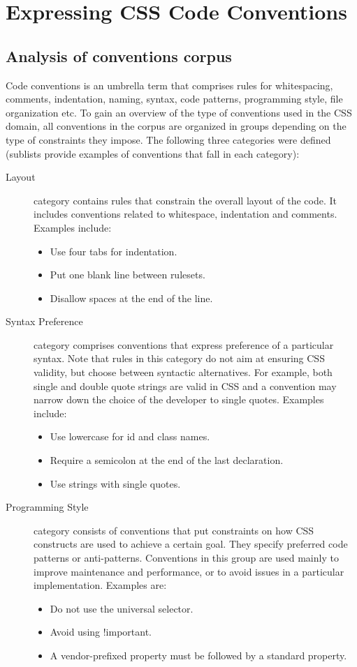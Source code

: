 \chapter{Expressing CSS Code Conventions}
\label{sec:expressing}

\section{Analysis of conventions corpus}

Code conventions is an umbrella term that comprises rules for whitespacing, comments, indentation,
naming, syntax, code patterns, programming style, file organization etc. To gain an overview of the
type of conventions used in the CSS domain, all conventions in the corpus are organized in groups
depending on the type of constraints they impose. The following three categories were defined
(sublists provide examples of conventions that fall in each category):

\begin{description}
  \item[Layout] category contains rules that constrain the overall layout of the code. It includes conventions related to whitespace, indentation and comments. Examples include:
  \begin{itemize}
  \item Use four tabs for indentation.
  \item Put one blank line between rulesets.
  \item Disallow spaces at the end of the line.
  \end{itemize}
  \item[Syntax Preference] category comprises conventions that express preference of a particular syntax. Note that rules in this category do not aim at ensuring CSS validity, but choose between syntactic alternatives. For example, both single and double quote strings are valid in CSS and a convention may narrow down the choice of the developer to single quotes. Examples include:
  \begin{itemize}
  \item Use lowercase for id and class names.
  \item Require a semicolon at the end of the last declaration.
  \item Use strings with single quotes.
  \end{itemize}
  \item[Programming Style] category consists of conventions that put constraints on how CSS constructs are used to achieve a certain goal. They specify preferred code patterns or anti-patterns. Conventions in this group are used mainly to improve maintenance and performance, or to avoid issues in a particular implementation. Examples are:
  \begin{itemize}
  \item Do not use the universal selector.
  \item Avoid using !important.
  \item A vendor-prefixed property must be followed by a standard property.
  \end{itemize}
\end{description}

